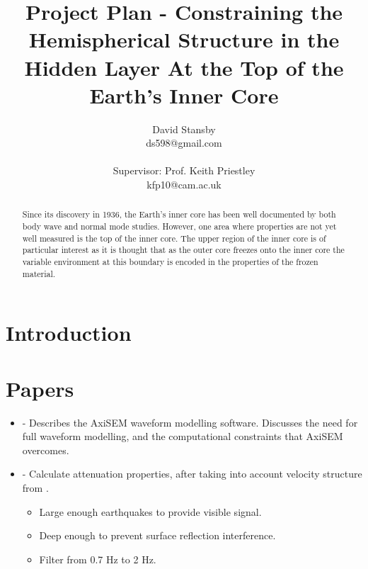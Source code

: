 \documentclass[11pt,a4paper]{article}
\begin{document}
\title{Project Plan - Constraining the Hemispherical Structure in the Hidden Layer At the Top of the Earth's Inner Core}
\author{David Stansby \\ ds598@gmail.com \\  \\ Supervisor: Prof. Keith Priestley \\ kfp10@cam.ac.uk }
\maketitle

\begin{abstract}
Since its discovery in 1936, the Earth's inner core has been well documented by both body wave and normal mode studies. However, one area where properties are not yet well measured is the top of the inner core. The upper region of the inner core is of particular interest as it is thought that as the outer core freezes onto the inner core the variable environment at this boundary is encoded in the properties of the frozen material. 
\end{abstract}

\section{Introduction}

\section{Papers}
\begin{itemize}
	\item \cite{Nissen-Meyer2014} - Describes the AxiSEM waveform modelling software. Discusses the need for full waveform modelling, and the computational constraints that AxiSEM overcomes.

	\item \cite{Waszek2013a} - Calculate attenuation properties, after taking into account velocity structure from \cite{Waszek2011a}.
\begin{itemize}
	\item Large enough earthquakes to provide visible signal.
	\item Deep enough to prevent surface reflection interference.
	\item Filter from 0.7 Hz to 2 Hz.
\end{itemize}

\end{itemize}


\end{document}
